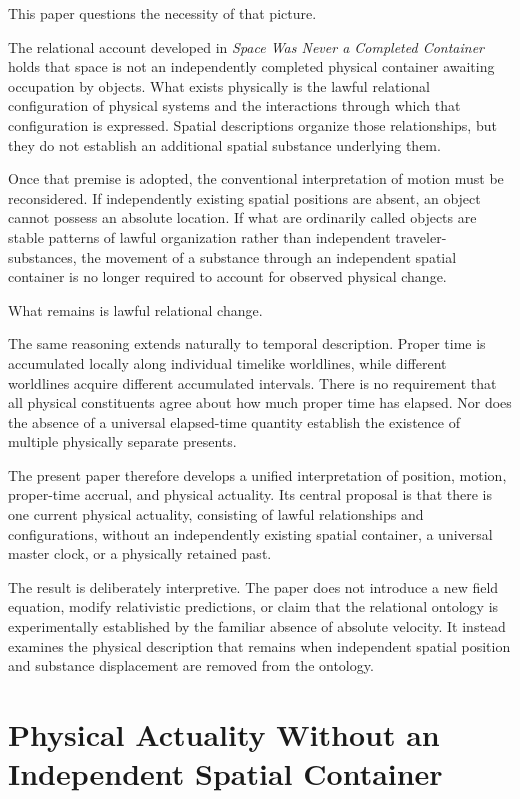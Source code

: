 \documentclass[12pt,onecolumn]{article}
\begin{document}
This paper questions the necessity of that picture.

The relational account developed in \emph{Space Was Never a Completed Container} \cite{SpaceContainer} holds that space is not an independently completed physical container awaiting occupation by objects. What exists physically is the lawful relational configuration of physical systems and the interactions through which that configuration is expressed. Spatial descriptions organize those relationships, but they do not establish an additional spatial substance underlying them.

Once that premise is adopted, the conventional interpretation of motion must be reconsidered. If independently existing spatial positions are absent, an object cannot possess an absolute location. If what are ordinarily called objects are stable patterns of lawful organization rather than independent traveler-substances, the movement of a substance through an independent spatial container is no longer required to account for observed physical change.

What remains is lawful relational change.

The same reasoning extends naturally to temporal description. Proper time is accumulated locally along individual timelike worldlines, while different worldlines acquire different accumulated intervals. There is no requirement that all physical constituents agree about how much proper time has elapsed. Nor does the absence of a universal elapsed-time quantity establish the existence of multiple physically separate presents.

The present paper therefore develops a unified interpretation of position, motion, proper-time accrual, and physical actuality. Its central proposal is that there is one current physical actuality, consisting of lawful relationships and configurations, without an independently existing spatial container, a universal master clock, or a physically retained past.

The result is deliberately interpretive. The paper does not introduce a new field equation, modify relativistic predictions, or claim that the relational ontology is experimentally established by the familiar absence of absolute velocity. It instead examines the physical description that remains when independent spatial position and substance displacement are removed from the ontology.

\section{Physical Actuality Without an Independent Spatial Container}
\end{document}
